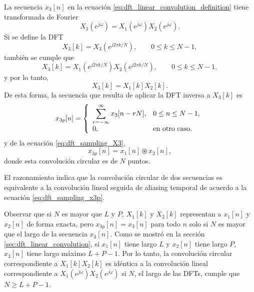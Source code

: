 \documentclass[a4paper]{report}
\begin{document}
La secuencia \(x_3[n]\) en la ecuación \ref{eq:dft_linear_convolution_definition} tiene transformada de Fourier 
\[
 X_3(e^{j\omega})=X_1(e^{j\omega})X_2(e^{j\omega}).
\]
Si se define la DFT 
\[
 X_3[k]=X_3(e^{j2\pi k/N}),\qquad 0\leq k\leq N-1,
\]
también se cumple que 
\[
 X_3[k]=X_1(e^{j2\pi k/N})X_2(e^{j2\pi k/N}),\qquad 0\leq k\leq N-1,
\]
y por lo tanto,
\begin{equation}\label{eq:dft_sampling_X3}
 X_3[k]=X_1[k]X_2[k]. 
\end{equation}
De esta forma, la secuencia que resulta de aplicar la DFT inversa a \(X_3[k]\) es
\begin{equation}\label{eq:dft_sampling_x3p}
 x_{3p}[n]=
 \left\{ 
 \begin{array}{ll}
  \displaystyle\sum_{r=-\infty}^\infty x_3[n-rN], & 0\leq n\leq N-1,\\[\medskipamount]
  0, & \textrm{en otro caso.}
 \end{array}
 \right. 
\end{equation}
y de la ecuación \ref{eq:dft_sampling_X3},
\[
 x_{3p}[n]=x_1[n]\circledast x_2[n],
\]
donde esta convolución circular es de \(N\) puntos.

El razonamiento indica que la convolución circular de dos secuencias es equivalente a la convolución lineal seguida de aliasing temporal de acuerdo a la ecuación \ref{eq:dft_sampling_x3p}.

Observar que si \(N\) es mayor que \(L\) y \(P\), \(X_1[k]\) y \(X_2[k]\) representan a \(x_1[n]\) y \(x_2[n]\) de forma exacta, pero \(x_{3p}[n]=x_3[n]\) para todo \(n\) solo si \(N\) es mayor que el largo de la secuencia \(x_3[n]\). Como se mostró en la sección \ref{sec:dft_linear_convolution}, si \(x_1[n]\) tiene largo \(L\) y \(x_2[n]\) tiene largo \(P\), \(x_3[n]\) tiene largo máximo \(L+P-1\). Por lo tanto, la convolución circular correspondiente a \(X_1[k]X_2[k]\) es idéntica a la convolución lineal correspondiente a \(X_1(e^{j\omega})X_2(e^{j\omega})\) si \(N\), el largo de las DFTs, cumple que \(N\geq L+P-1\).
\end{document}
